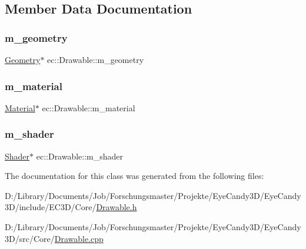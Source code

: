 \subsection{Member Data Documentation}
\mbox{\label{classec_1_1_drawable_a27c423409922385858f1ed89b4e85e70}} 
\subsubsection{\texorpdfstring{m\+\_\+geometry}{m\_geometry}}
{\footnotesize\ttfamily \mbox{\hyperlink{classec_1_1_geometry}{Geometry}}$\ast$ ec\+::\+Drawable\+::m\+\_\+geometry\hspace{0.3cm}{\ttfamily [protected]}}

\mbox{\label{classec_1_1_drawable_ae95da71e937a2008a84300b8d29ac052}} 
\subsubsection{\texorpdfstring{m\+\_\+material}{m\_material}}
{\footnotesize\ttfamily \mbox{\hyperlink{classec_1_1_material}{Material}}$\ast$ ec\+::\+Drawable\+::m\+\_\+material\hspace{0.3cm}{\ttfamily [protected]}}

\mbox{\label{classec_1_1_drawable_aee71f07b65189391a7a465d880d744e3}} 
\subsubsection{\texorpdfstring{m\+\_\+shader}{m\_shader}}
{\footnotesize\ttfamily \mbox{\hyperlink{classec_1_1_shader}{Shader}}$\ast$ ec\+::\+Drawable\+::m\+\_\+shader\hspace{0.3cm}{\ttfamily [protected]}}



The documentation for this class was generated from the following files\+:\begin{DoxyCompactItemize}
\item 
D\+:/\+Library/\+Documents/\+Job/\+Forschungsmaster/\+Projekte/\+Eye\+Candy3\+D/\+Eye\+Candy3\+D/include/\+E\+C3\+D/\+Core/\mbox{\hyperlink{_drawable_8h}{Drawable.\+h}}\item 
D\+:/\+Library/\+Documents/\+Job/\+Forschungsmaster/\+Projekte/\+Eye\+Candy3\+D/\+Eye\+Candy3\+D/src/\+Core/\mbox{\hyperlink{_drawable_8cpp}{Drawable.\+cpp}}\end{DoxyCompactItemize}
